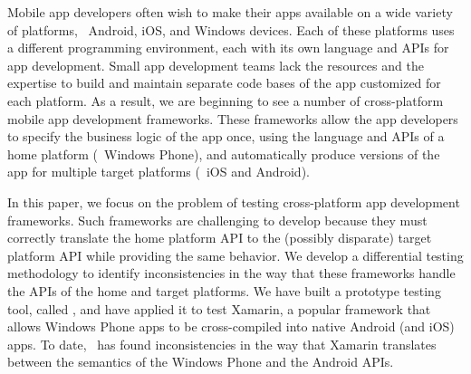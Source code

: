 %

Mobile app developers often wish to make their apps available on a wide variety
of platforms, \eg~Android, iOS, and Windows devices. Each of these platforms
uses a different programming environment, each with its own language and APIs
for app development. Small app development teams lack the resources and the
expertise to build and maintain separate code bases of the app customized for
each platform. As a result, we are beginning to see a number of cross-platform
mobile app development frameworks. These frameworks allow the app developers to
specify the business logic of the app once, using the language and APIs of a
home platform (\eg~Windows Phone), and automatically produce versions of the
app for multiple target platforms (\eg~iOS and Android). 

In this paper, we focus on the problem of testing cross-platform app
development frameworks. Such frameworks are challenging to develop because
they must correctly translate the home platform API to the (possibly disparate)
target platform API while providing the same behavior. We develop a
differential testing methodology to identify inconsistencies in the way that these
frameworks handle the APIs of the home and target platforms.  We have built a
prototype testing tool, called \tool, and have applied it to test Xamarin, a
popular framework that allows Windows Phone apps to be cross-compiled into
native Android (and iOS) apps.  To date, \tool\ has found 
inconsistencies in the way that Xamarin translates between the semantics of the
Windows Phone and the Android APIs.
